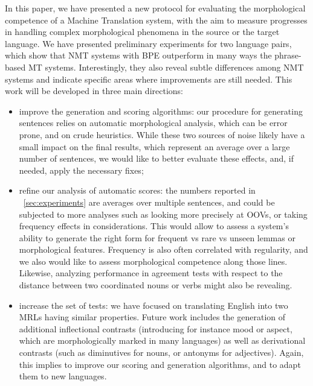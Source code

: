 \documentclass[11pt,letterpaper,final,nohyperref]{article}
\begin{document}
In this paper, we have presented a new protocol for evaluating the morphological competence of a Machine Translation system, with the aim to measure progresses in handling complex morphological phenomena in the source or the target language. We have presented preliminary experiments for two language pairs, which show that NMT systems with BPE outperform in many ways the phrase-based MT systems. Interestingly, they also reveal subtle differences among NMT systems and indicate specific areas where improvements are still needed.
This work will be developed in three main directions: 
\begin{itemize}
\item improve the generation and scoring algorithms: our procedure for generating sentences relies on automatic morphological analysis, which can be error prone, and on crude heuristics. While these two sources of noise likely have a small impact on the final results, which represent an average over a large number of sentences, we would like to better evaluate these effects, and, if needed, apply the necessary fixes;
\item refine our analysis of automatic scores: the numbers reported in \textsection~\ref{sec:experiments} are averages over multiple sentences, and could be subjected to more analyses such as looking more precisely at OOVs, or taking frequency effects in considerations. This would allow to assess a system's ability to generate the right form for frequent vs rare vs unseen lemmas or morphological features.
Frequency is also often correlated with regularity, and we also would like to assess morphological competence along those lines. Likewise, analyzing performance in agreement tests with respect to the distance between two coordinated nouns or verbs might also be revealing.
\item increase the set of tests: we have focused on translating English into two MRLs having similar properties. Future work includes the generation of additional inflectional contrasts (introducing for instance mood or aspect, which are morphologically marked in many languages) as well as derivational contrasts (such as diminutives for nouns, or antonyms for adjectives). Again, this implies to improve our scoring and generation algorithms, and to adapt them to new languages. 
\end{itemize}
\end{document}
